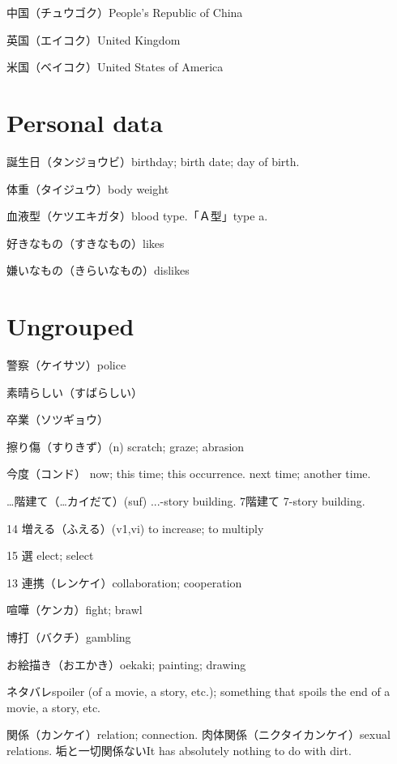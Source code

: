 中国（チュウゴク）People's Republic of China

英国（エイコク）United Kingdom

米国（ベイコク）United States of America

\section{Personal data}

誕生日（タンジョウビ）birthday; birth date; day of birth.

体重（タイジュウ）body weight

血液型（ケツエキガタ）blood type.「Ａ型」type a.

好きなもの（すきなもの）likes

嫌いなもの（きらいなもの）dislikes

\section{Ungrouped}

警察（ケイサツ）police

素晴らしい（すばらしい）

卒業（ソツギョウ）

擦り傷（すりきず）(n) scratch; graze; abrasion

今度（コンド）
now; this time; this occurrence.
next time; another time.

…階建て（…カイだて）(suf) ...-story building.
7階建て 7-story building.

14 増える（ふえる）(v1,vi) to increase; to multiply

15 選 elect; select

13 連携（レンケイ）collaboration; cooperation

喧嘩（ケンカ）fight; brawl

博打（バクチ）gambling

お絵描き（おエかき）oekaki; painting; drawing

ネタバレspoiler (of a movie, a story, etc.); something that spoils the end of a movie, a story, etc.

関係（カンケイ）relation; connection.
肉体関係（ニクタイカンケイ）sexual relations.
垢と一切関係ないIt has absolutely nothing to do with dirt.
